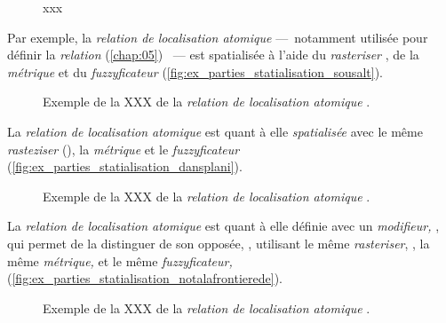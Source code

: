 \begin{figure}
  \centering
  
  \caption{xxx}
  \label{fig:structure_spatialisation_ontologie}
\end{figure}

Par exemple, la \emph{relation de localisation atomique}  ---~notamment utilisée pour définir la \emph{relation}  (\autoref{chap:05}) ~--- est spatialisée à l'aide du \emph{rasteriser} , de la \emph{métrique}  et du \emph{fuzzyficateur}  (\autoref{fig:ex_parties_statialisation_sousalt}).

\begin{figure}
  \centering
  
  \caption{Exemple de la XXX de la \emph{relation de localisation
      atomique} \protect{}.}
  \label{fig:ex_parties_statialisation_sousalt}
\end{figure}

La \emph{relation de localisation atomique}  est quant à elle \emph{spatialisée} avec le même \emph{rasteziser} (), la \emph{métrique}  et le \emph{fuzzyficateur}  (\autoref{fig:ex_parties_statialisation_dansplani}).

\begin{figure}
  \centering
  
  \caption{Exemple de la XXX de la \emph{relation de localisation
      atomique} \protect{}.}
  \label{fig:ex_parties_statialisation_dansplani}
\end{figure}

La \emph{relation de localisation atomique}  est quant à elle définie avec un \emph{modifieur,} , qui permet de la distinguer de son opposée, , utilisant le même \emph{rasteriser}, , la même \emph{métrique,}  et le même \emph{fuzzyficateur,}  (\autoref{fig:ex_parties_statialisation_notalafrontierede}).

\begin{figure}
  \centering
  
  \caption{Exemple de la XXX de la \emph{relation de localisation
      atomique} \protect{}.}
  \label{fig:ex_parties_statialisation_notalafrontierede}
\end{figure}


